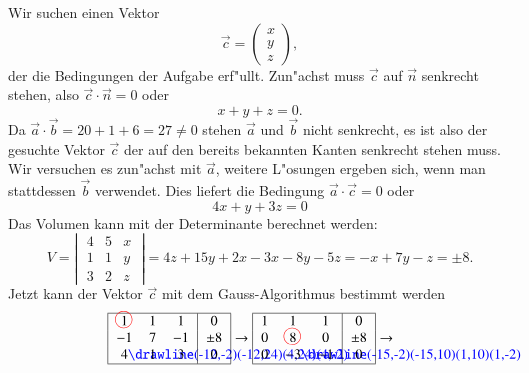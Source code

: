 \begin{beispiel}
{\parindent 0pt Wir suchen einen Vektor}
\[
\vec c=\begin{pmatrix}x\\y\\z\end{pmatrix},
\]
der die Bedingungen der Aufgabe erf"ullt. Zun"achst muss $\vec c$ auf
$\vec n$ senkrecht stehen, also $\vec c\cdot\vec n=0$ oder
\[
x+y+z=0.
\]
Da $\vec a\cdot\vec b=20+1+6=27\ne 0$ stehen $\vec a$ und $\vec b$
nicht senkrecht, es ist also der gesuchte Vektor $\vec c$ der auf den bereits
bekannten Kanten senkrecht stehen muss.
Wir versuchen es zun"achst
mit $\vec a$, weitere L"osungen ergeben sich, wenn man stattdessen $\vec b$
verwendet.
Dies liefert die Bedingung $\vec a\cdot\vec c=0$ oder
\[
4x+y+3z=0
\]
Das Volumen kann mit der Determinante berechnet werden:
\[
V=\left|\;
\begin{matrix}
4&5&x\\
1&1&y\\
3&2&z
\end{matrix}
\;\right|=
4z+15y+2x-3x-8y-5z=-x+7y-z=\pm8.
\]
Jetzt kann der Vektor $\vec c$ mit dem Gauss-Algorithmus bestimmt werden
\begin{align*}
\begin{tabular}{|>{$}c<{$}>{$}c<{$}>{$}c<{$}|>{$}c<{$}|}
\hline
1%
\begin{picture}(0,0)
\color{red}\put(-3,4){\circle{12}}
\end{picture}%
&1&1&0\\
-1&7&-1&\pm8\\
4%
\begin{picture}(0,0)%
\color{blue}\drawline(-12,-2)(-12,24)(4,24)(4,-2)
\end{picture}%
&1&3&0\\
\hline
\end{tabular}
&
\rightarrow
\begin{tabular}{|>{$}c<{$}>{$}c<{$}>{$}c<{$}|>{$}c<{$}|}
\hline
1&1&1&0\\
0&8%
\begin{picture}(0,0)
\color{red}\put(-3,4){\circle{12}}
\end{picture}%
&0&\pm8\\
0&-3%
\begin{picture}(0,0)%
\color{blue}\drawline(-15,-2)(-15,10)(1,10)(1,-2)
\end{picture}%
&-1&0\\
\hline
\end{tabular}
\rightarrow
\begin{tabular}{|>{$}c<{$}>{$}c<{$}>{$}c<{$}|>{$}c<{$}|}

\end{tabular}
\end{align*}
\end{beispiel}
